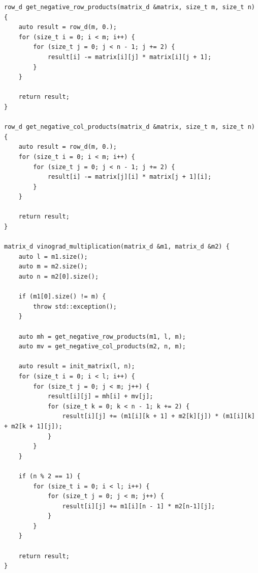 \documentclass[a4paper,12pt]{article}
\begin{document}
            	\begin{lstlisting}[frame=single,caption=Алгоритм Винограда с оптимизациями, breaklines]
row_d get_negative_row_products(matrix_d &matrix, size_t m, size_t n) {
    auto result = row_d(m, 0.);
    for (size_t i = 0; i < m; i++) {
        for (size_t j = 0; j < n - 1; j += 2) {
            result[i] -= matrix[i][j] * matrix[i][j + 1];
        }
    }

    return result;
}

row_d get_negative_col_products(matrix_d &matrix, size_t m, size_t n) {
    auto result = row_d(m, 0.);
    for (size_t i = 0; i < m; i++) {
        for (size_t j = 0; j < n - 1; j += 2) {
            result[i] -= matrix[j][i] * matrix[j + 1][i];
        }
    }

    return result;
}

matrix_d vinograd_multiplication(matrix_d &m1, matrix_d &m2) {
    auto l = m1.size();
    auto m = m2.size();
    auto n = m2[0].size();

    if (m1[0].size() != m) {
        throw std::exception();
    }

    auto mh = get_negative_row_products(m1, l, m);
    auto mv = get_negative_col_products(m2, n, m);

    auto result = init_matrix(l, n);
    for (size_t i = 0; i < l; i++) {
        for (size_t j = 0; j < m; j++) {
            result[i][j] = mh[i] + mv[j];
            for (size_t k = 0; k < n - 1; k += 2) {
                result[i][j] += (m1[i][k + 1] + m2[k][j]) * (m1[i][k] + m2[k + 1][j]);
            }
        }
    }

    if (n % 2 == 1) {
        for (size_t i = 0; i < l; i++) {
            for (size_t j = 0; j < m; j++) {
                result[i][j] += m1[i][n - 1] * m2[n-1][j];
            }
        }
    }

    return result;
}
				\end{lstlisting}
    \newpage
\end{document}
